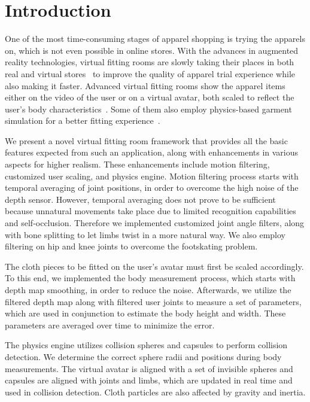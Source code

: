 \documentclass[number,preprint,review,12pt]{elsarticle}
\begin{document}
\singlespacing

\doublespacing

\pagebreak

\section{Introduction}
\label{sec:Introduction}
One of the most time-consuming stages of apparel shopping is trying the apparels on, which is not even possible in online stores. With the advances in augmented reality technologies, virtual fitting rooms are slowly taking their places in both real and virtual stores~\cite{Fitnect2012,Styku2013} to improve the quality of apparel trial experience while also making it faster.
Advanced virtual fitting rooms show the apparel items either on the video of the user or on a virtual avatar, both scaled to reflect the user's body characteristics~\cite{FaceCake2013}. Some of them also employ physics-based garment simulation for a better fitting experience~\cite{Styku2013}.

We present a novel virtual fitting room framework that provides all the basic features expected from such an application, along with enhancements in various aspects for higher realism. These enhancements include motion filtering, customized user scaling, and physics engine. Motion filtering process starts with temporal averaging of joint positions,
in order to overcome the high noise of the depth sensor. However, temporal
averaging does not prove to be sufficient because unnatural movements take
place due to limited recognition capabilities and self-occlusion.
Therefore we implemented customized joint angle filters, along with bone
splitting to let limbs twist in a more natural way. We also employ filtering on hip and knee joints to overcome the footskating problem.

The cloth pieces to be fitted on the user's avatar must first be scaled
accordingly. To this end, we implemented the body measurement process, 
which starts with depth map smoothing, in order to reduce the noise. 
Afterwards, we utilize the filtered depth map along with filtered
user joints to measure a set of parameters, which are used in conjunction
to estimate the body height and width. These parameters are averaged over 
time to minimize the error.

The physics engine utilizes collision spheres and capsules to perform
collision detection. We determine the correct sphere radii and positions 
during body measurements. The virtual avatar is aligned with a set of 
invisible spheres and capsules are aligned with joints and limbs, 
which are updated in real time and used in collision detection. 
Cloth particles are also affected by gravity and inertia.
\end{document}
